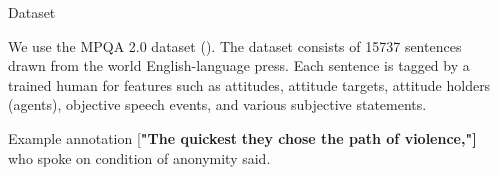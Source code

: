 \documentclass[final]{beamer}
\newlength{\sepwid}
\newlength{\twocolwid}
\begin{document}
\begin{frame}[t]
\begin{columns}[t]
\begin{column}{\sepwid}\end{column} %

\begin{column}{\twocolwid} %



\begin{column}{\twocolwid}\vspace{-.6in} %


\begin{block}{Dataset}

We use the MPQA 2.0 dataset (\cite{wiebe2005annotating}). The dataset consists of 15737 sentences drawn from the world English-language press. Each sentence is tagged by a trained human for features such as attitudes, attitude targets, attitude holders (agents), objective speech events, and various subjective statements.

\begin{alertblock}{Example annotation}
[\textbf{"The quickest }  \textbf{they chose the path of violence,"]}  who spoke on condition of anonymity said.
\end{alertblock}

\end{block}


\end{column} %

\begin{column}{\twocolwid}\vspace{-.6in} %



\end{column}
\end{column}
\end{columns}
\end{frame}
\end{document}

